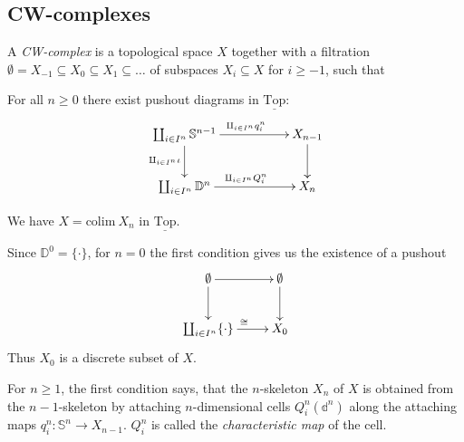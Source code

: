 \documentclass[11pt]{book}
\numberwithin{dummy}{section}
\theoremstyle{nonumberbreak}
\newenvironment{defin}[1][]{\ifthenelse{\equal{#1}{}}{\definition}{\definition[#1]}\rm}{\enddefinition}
\newenvironment{expl}[1][]{\ifthenelse{\equal{#1}{}}{\explanations}{\explanations[#1]}\rm}{\endexplanations}
\newcommand{\topsp}{\underline{\mathrm{Top}}}
\newcommand{\la}{\longrightarrow}
\begin{document}
\begin{spacing}{1.4}
\section{CW-complexes} %

\thispagestyle{empty}

\begin{defin}
A \textit{CW-complex} is a topological space $X$ together with a filtration $\emptyset = X_{-1} \subseteq X_0 \subseteq X_1 \subseteq \ldots$ of subspaces $X_i \subseteq X$ for $i \geqslant -1$, such that
\begin{compactenum}
\item For all $n \geqslant 0$ there exist pushout diagrams in $\topsp$:
$$
\begin{xy}
\xymatrix{
\coprod_{i \in I^n} \mathbb{S}^{n-1} \ar[rr]^{\amalg_{i \in I^n} q_i^n} \ar[d]_{\amalg_{i \in I^n} \iota} && X_{n-1} \ar[d] \\ \coprod_{i \in I^n} \mathbb{D}^n \ar[rr]^{\amalg_{i \in I^n} Q_i^n} && X_n
}
\end{xy}
$$
\item We have $X= \mathrm{colim} \ X_n$ in $\topsp$. 
\end{compactenum}

\end{defin}


\begin{expl}
\begin{compactenum}
\item Since $\mathbb{D}^0=\{ \cdot\}$, for $n=0$ the first condition gives us the existence of a pushout
$$
\begin{xy}
\xymatrix{
\emptyset \ar[d] \ar[r] & \emptyset \ar[d] \\ \coprod_{ i \in I^n} \{\cdot \} \ar[r]^{\cong} & X_0
}
\end{xy}
$$
Thus $X_0$ is a discrete subset of $X$.

\item For $n\geqslant 1$, the first condition says, that the $n$-skeleton $X_n$ of $X$ is obtained from the $n-1$-skeleton by attaching $n$-dimensional cells $Q_i^n(\mathbb{d}^n)$ along the attaching maps $q_i^n: \mathbb{S}^n \la X_{n-1}$. $Q_i^n$ is called the \textit{characteristic map} of the cell.


\end{compactenum}
\end{expl}
\end{spacing}
\end{document}
